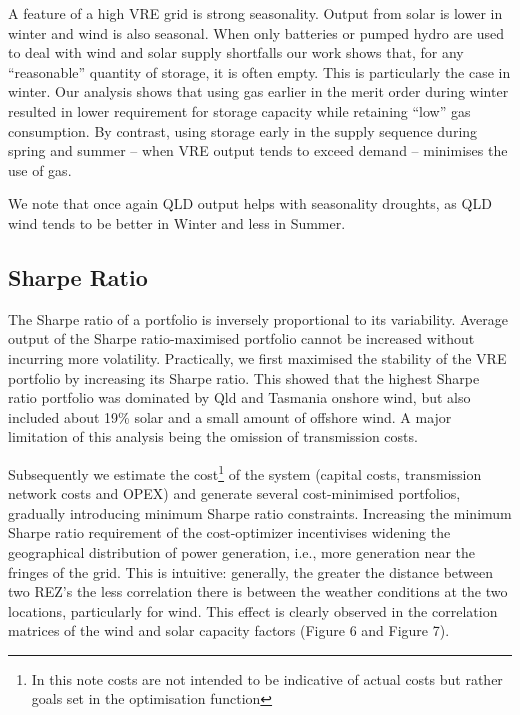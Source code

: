 \documentclass[
  letterpaper,
  DIV=11,
  numbers=noendperiod]{scrartcl}
\begin{document}
A feature of a high VRE grid is strong seasonality. Output from solar is
lower in winter and wind is also seasonal. When only batteries or pumped
hydro are used to deal with wind and solar supply shortfalls our work
shows that, for any ``reasonable'' quantity of storage, it is often
empty. This is particularly the case in winter. Our analysis shows that
using gas earlier in the merit order during winter resulted in lower
requirement for storage capacity while retaining ``low'' gas
consumption. By contrast, using storage early in the supply sequence
during spring and summer -- when VRE output tends to exceed demand --
minimises the use of gas.

We note that once again QLD output helps with seasonality droughts, as
QLD wind tends to be better in Winter and less in Summer.

\subsection{Sharpe Ratio}\label{sharpe-ratio}

The Sharpe ratio of a portfolio is inversely proportional to its
variability. Average output of the Sharpe ratio-maximised portfolio
cannot be increased without incurring more volatility. Practically, we
first maximised the stability of the VRE portfolio by increasing its
Sharpe ratio. This showed that the highest Sharpe ratio portfolio was
dominated by Qld and Tasmania onshore wind, but also included about 19\%
solar and a small amount of offshore wind. A major limitation of this
analysis being the omission of transmission costs.

Subsequently we estimate the cost\footnote{In this note costs are not
  intended to be indicative of actual costs but rather goals set in the
  optimisation function} of the system (capital costs, transmission
network costs and OPEX) and generate several cost-minimised portfolios,
gradually introducing minimum Sharpe ratio constraints. Increasing the
minimum Sharpe ratio requirement of the cost-optimizer incentivises
widening the geographical distribution of power generation, i.e., more
generation near the fringes of the grid. This is intuitive: generally,
the greater the distance between two REZ's the less correlation there is
between the weather conditions at the two locations, particularly for
wind. This effect is clearly observed in the correlation matrices of the
wind and solar capacity factors (Figure 6 and Figure 7).
\end{document}
